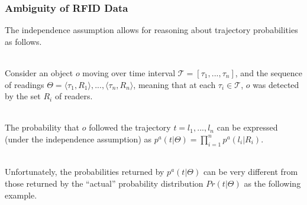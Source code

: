 \begin{frame}
\begin{columns}
\end{columns}

\end{frame}


\begin{frame}
\frametitle{Ambiguity of RFID Data}

The independence assumption allows for reasoning about trajectory probabilities as follows.\\~\\
\pause

Consider an object $o$ moving over time interval $\mathcal{T} = [\tau_1,...,\tau_n]$, and the sequence of readings $\Theta = \langle \tau_1, R_1 \rangle, ..., \langle \tau_n, R_n \rangle$, meaning that at each $\tau_i \in \mathcal{T}$, $o$ was detected by the set $R_i$ of readers.\\~\\
\pause

The probability that $o$ followed the trajectory $t = l_1, ..., l_n$ can be expressed (under the independence assumption) as $p^a(t|\Theta) = \prod_{i=1}^n p^a(l_i|R_i)$.\\~\\
\pause

Unfortunately, the probabilities returned by $p^a(t|\Theta)$ can be very different from those returned by the ``actual'' probability distribution $Pr(t|\Theta)$ as the following example.

\end{frame}


